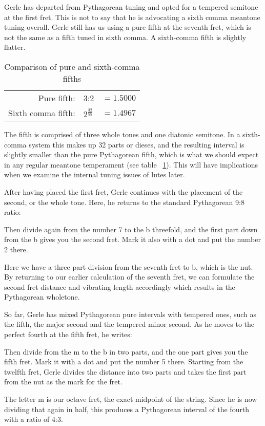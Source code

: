 Gerle has departed from Pythagorean tuning and opted for a tempered semitone at the first
fret.  This is not to say that he is advocating a sixth comma meantone tuning overall.
Gerle still has us using a pure fifth at the seventh fret, which is not the same as a
fifth tuned in sixth comma.  A sixth-comma fifth is slightly flatter.
\begin{table}[h!]
    \begin{center}
    \begin{tabular}{ r l l }
        Pure fifth:        & 3:2                 & $ = 1.5000 $ \\
        Sixth comma fifth: & $ 2^\frac{32}{55} $ & $ = 1.4967 $ \\
    \end{tabular}
    \end{center}
    \caption{Comparison of pure and sixth-comma fifths}
    \label{table:6fifths}
\end{table}
The fifth is comprised of three whole tones and one diatonic semitone. In a sixth-comma
system this makes up 32 parts or dieses, and the resulting interval is slightly smaller
than the pure Pythagorean fifth, which is what we should expect in any regular meantone
temperament (see table ~\ref{table:6fifths}). This will have implications when we examine
the internal tuning issues of lutes later.

After having placed the first fret, Gerle continues with the placement of the second, or the whole tone.
Here, he returns to the standard Pythagorean 9:8 ratio:
\begin{blocks}
Then divide again from the number 7 to the b threefold, and the first part down
from the b gives you the second fret.  Mark it also with a dot and put the
number 2 there.
\end{blocks}
Here we have a three part division from the seventh fret to b, which is the nut.
By returning to our earlier calculation of the seventh fret, we can formulate the
second fret distance and vibrating length accordingly which results in the Pythagorean
wholetone.

So far, Gerle has mixed Pythagorean pure intervals with tempered ones, such as
the fifth, the major second and the tempered minor second.  As he moves to the
perfect fourth at the fifth fret, he writes:
\begin{blocks}
Then divide from the m to the b in two parts, and the one part gives you the
fifth fret. Mark it with a dot and put the number 5 there. Starting from the
twelfth fret, Gerle divides the distance into two parts and takes the first part
from the nut as the mark for the fret.
\end{blocks}
The letter m is our octave fret, the exact midpoint of the string. Since
he is now dividing that again in half, this produces a
Pythagorean interval of the fourth with a ratio of 4:3.

